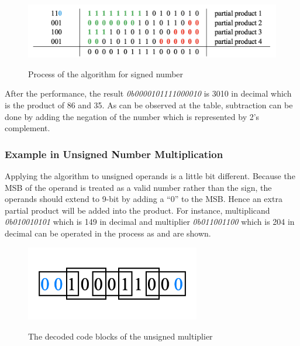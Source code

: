 \begin{figure}[!ht]
	\centering
	\caption{Process of the algorithm for signed number}
	\includegraphics[width=5.7in]{../img/r4b_process_1.png}
	\label{fig:r4b_process_1}
\end{figure}

After the performance, the result \textit{0b0000101111000010} is 3010 in decimal which is the product of 86 and 35.
As can be observed at the table, subtraction can be done by adding the negation of the number which is represented
by 2’s complement.

\subsubsection{Example in Unsigned Number Multiplication}

Applying the algorithm to unsigned operands is a little bit different.
Because the MSB of the operand is treated as a valid number rather than the sign,
the operands should extend to 9-bit by adding a “0” to the MSB. Hence an extra partial product will be added into the product.
For instance, multiplicand \textit{0b010010101} which is 149 in decimal and multiplier \textit{0b011001100}
which is 204 in decimal can be operated in the process as  and  are shown.

\begin{figure}[!ht]
	\centering
	\caption{The decoded code blocks of the unsigned multiplier}
	\includegraphics[width=3in]{../img/booth_code_2.png}
	\label{fig:booth_code_2}
\end{figure}

